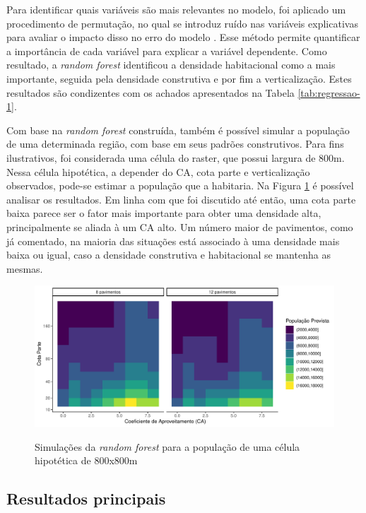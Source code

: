 Para identificar quais variáveis são mais relevantes no modelo, foi aplicado um procedimento de permutação, no qual se introduz ruído nas variáveis explicativas para avaliar o impacto disso no erro do modelo \cite{breiman2001random, Nembrini2018}. Esse método permite quantificar a importância de cada variável para explicar a variável dependente. Como resultado, a \textit{random forest} identificou a densidade habitacional como a mais importante, seguida pela densidade construtiva e por fim a verticalização. Estes resultados são condizentes com os achados apresentados na Tabela \ref{tab:regressao-1}.

Com base na \textit{random forest} construída, também é possível simular a população de uma determinada região, com base em seus padrões construtivos. Para fins ilustrativos, foi considerada uma célula do raster, que possui largura de 800m. Nessa célula hipotética, a depender do CA, cota parte e verticalização observados, pode-se estimar a população que a habitaria. Na Figura \ref{fig:previsoes} é possível analisar os resultados. Em linha com que foi discutido até então, uma cota parte baixa parece ser o fator mais importante para obter uma densidade alta, principalmente se aliada à um CA alto. Um número maior de pavimentos, como já comentado, na maioria das situações está associado à uma densidade mais baixa ou igual, caso a densidade construtiva e habitacional se mantenha as mesmas.

\begin{figure}[h]
    \centering
    \caption{Simulações da \textit{random forest} para a população de uma célula hipotética de 800x800m}
    \includegraphics[width = \textwidth]{figuras/previsoes.pdf}
    \label{fig:previsoes}
\end{figure}

\subsection{Resultados principais}

